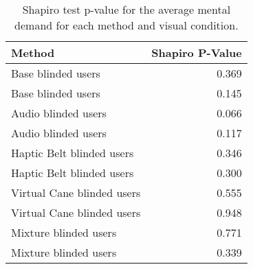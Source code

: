 
\begin{table}[!htb]
\centering
\caption{Shapiro test p-value for the average mental demand for each method and visual condition.}
\label{tab:shapiro_mental_demand_avg}
\begin{tabular}{lr}
\toprule
                    Method &  Shapiro P-Value \\
\midrule
        Base blinded users &            0.369 \\
        Base blinded users &            0.145 \\
       Audio blinded users &            0.066 \\
       Audio blinded users &            0.117 \\
 Haptic Belt blinded users &            0.346 \\
 Haptic Belt blinded users &            0.300 \\
Virtual Cane blinded users &            0.555 \\
Virtual Cane blinded users &            0.948 \\
     Mixture blinded users &            0.771 \\
     Mixture blinded users &            0.339 \\
\bottomrule
\end{tabular}
\end{table}

